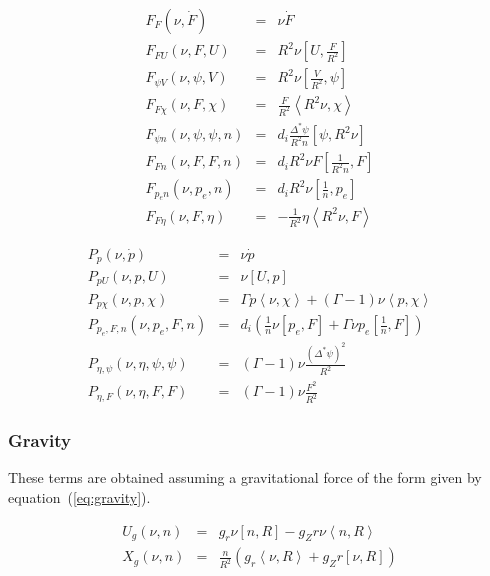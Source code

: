 \documentclass[letterpaper]{book}
\newcommand{\gs}[1]{\Delta^* #1}
\newcommand{\pb}[2]{\left[#1,#2\right]}
\newcommand{\ip}[2]{\left\langle  #1,#2\right\rangle}
\begin{document}
\begin{equation}
  \begin{array}{lcl}
    F_F (\nu, \dot{F}) & = & \nu \dot{F}\\
    F_{F U}(\nu, F, U) & = & R^2 \nu \pb{U}{\frac{F}{R^2}}\\
    F_{\psi V}(\nu, \psi, V) & = & R^2 \nu \pb{\frac{V}{R^2}}{\psi}\\
    F_{F \chi}(\nu, F, \chi) & = & \frac{F}{R^2} \ip{R^2 \nu}{\chi}\\
    F_{\psi n}(\nu, \psi, \psi, n) & = &
       d_i \frac{\gs{\psi}}{R^2 n}\pb{\psi}{R^2\nu}\\
    F_{F n}(\nu, F, F, n) & = &
       d_i R^2 \nu F \pb{\frac{1}{R^2 n}}{F}\\
    F_{p_e n}(\nu, p_e, n) & = & d_i R^2 \nu \pb{\frac{1}{n}}{p_e}\\
    F_{F \eta}(\nu, F, \eta) & = & -\frac{1}{R^2} \eta \ip{R^2 \nu}{F}
  \end{array}
\end{equation}

\begin{equation}
  \begin{array}{lcl}
  P_p(\nu, \dot{p}) & = & \nu \dot{p}
  \\
  P_{p U}(\nu, p, U) & = & \nu \pb{U}{p}
  \\
  P_{p \chi}(\nu, p, \chi) & = & \Gamma p \ip{\nu}{\chi} 
    + (\Gamma - 1) \nu \ip{p}{\chi}
  \\
  P_{p_e, F, n}(\nu, p_e, F, n) & = & d_i \left( 
      \frac{1}{n} \nu \pb{p_e}{F} 
    + \Gamma \nu p_e \pb{\frac{1}{n}}{F} \right)
  \\
  P_{\eta, \psi}(\nu, \eta, \psi, \psi) & = & (\Gamma - 1) \nu
  \frac{(\gs{\psi})^2}{R^2}
  \\
  P_{\eta, F}(\nu, \eta, F, F) & = & (\Gamma - 1) \nu \frac{F^2}{R^2}
  \end{array}
\end{equation}

\subsubsection{Gravity}

These terms are obtained assuming a gravitational force of the form given by
equation~(\ref{eq:gravity}).

\begin{equation}
  \begin{array}{lcl}
    U_g(\nu, n) & = & g_r \nu \pb{n}{R} - g_Z r \nu \ip{n}{R}
    \\
    X_g(\nu, n) & = & \frac{n}{R^2} \left( 
    g_r \ip{\nu}{R} + g_Z r \pb{\nu}{R} \right)
  \end{array}
\end{equation}
\end{document}
